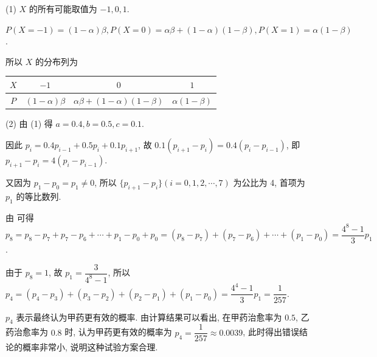 \begin{solutions}
(1) $X$ 的所有可能取值为 $-1, 0, 1$. 

$P(X=-1) = (1-\alpha)\beta, P(X=0) = \alpha\beta + (1-\alpha)(1-\beta), P(X=1) = \alpha(1-\beta)$.

所以 $X$ 的分布列为
\begin{center}
\begin{tabular}{|c|c|c|c|}
\hline
$X$ & $-1$ & $0$ & $1$ \\
\hline
$P$ & $(1-\alpha)\beta$ & $\alpha\beta + (1-\alpha)(1-\beta)$ & $\alpha(1-\beta)$ \\
\hline
\end{tabular}
\end{center}

(2)  由 (1) 得 $a=0.4, b=0.5, c=0.1$. 

因此 $p_i = 0.4p_{i-1} + 0.5p_i + 0.1p_{i+1}$, 故 $0.1(p_{i+1}-p_i) = 0.4(p_i-p_{i-1})$, 即 $p_{i+1}-p_i = 4(p_i-p_{i-1})$. 

又因为 $p_1-p_0 = p_1 \ne 0$, 所以 $\{p_{i+1}-p_i\} (i=0, 1, 2, \cdots, 7)$ 为公比为 4, 首项为 $p_1$ 的等比数列.

 由  可得 $p_8 = p_8-p_7+p_7-p_6+\cdots+p_1-p_0+p_0 = (p_8-p_7)+(p_7-p_6)+\cdots+(p_1-p_0) = \dfrac{4^8-1}{3}p_1$.

由于 $p_8=1$, 故 $p_1=\dfrac{3}{4^8-1}$, 所以 $p_4 = (p_4-p_3)+(p_3-p_2)+(p_2-p_1)+(p_1-p_0) = \dfrac{4^4-1}{3}p_1 = \dfrac{1}{257}$.

$p_4$ 表示最终认为甲药更有效的概率. 由计算结果可以看出, 在甲药治愈率为 $0.5$, 乙药治愈率为 $0.8$ 时, 认为甲药更有效的概率为 $p_4 = \dfrac{1}{257} \approx 0.0039$, 此时得出错误结论的概率非常小, 说明这种试验方案合理.


\end{solutions}